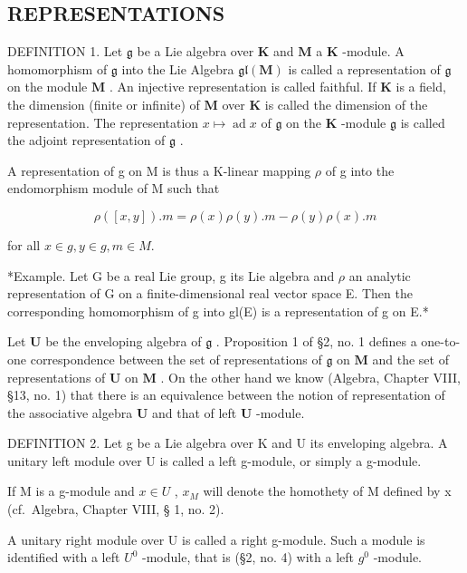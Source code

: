 \subsection{REPRESENTATIONS}

DEFINITION 1. Let \(\mathfrak{g}\) be a Lie algebra over \(\mathbf{K}\) and \(\mathbf{M}\) a \(\mathbf{K}\) -module. A homomorphism of \(\mathfrak{g}\) into the Lie Algebra \(\mathfrak{gl}(\mathbf{M})\) is called a representation of \(\mathfrak{g}\) on the module \(\mathbf{M}\) . An injective representation is called faithful. If \(\mathbf{K}\) is a field, the dimension (finite or infinite) of \(\mathbf{M}\) over \(\mathbf{K}\) is called the dimension of the representation. The representation \(x \mapsto \operatorname{ad} x\) of \(\mathfrak{g}\) on the \(\mathbf{K}\) -module \(\mathfrak{g}\) is called the adjoint representation of \(\mathfrak{g}\) .

A representation of g on M is thus a K-linear mapping \(\rho\) of g into the endomorphism module of M such that

\[
\rho ([ x, y ]). m = \rho (x) \rho (y). m - \rho (y) \rho (x). m
\]

for all \(x \in g, y \in g, m \in M.\)

*Example. Let G be a real Lie group, g its Lie algebra and \(\rho\) an analytic representation of G on a finite-dimensional real vector space E. Then the corresponding homomorphism of g into gl(E) is a representation of g on E.*

Let \(\mathbf{U}\) be the enveloping algebra of \(\mathfrak{g}\) . Proposition 1 of §2, no. 1 defines a one-to-one correspondence between the set of representations of \(\mathfrak{g}\) on \(\mathbf{M}\) and the set of representations of \(\mathbf{U}\) on \(\mathbf{M}\) . On the other hand we know (Algebra, Chapter VIII, §13, no. 1) that there is an equivalence between the notion of representation of the associative algebra \(\mathbf{U}\) and that of left \(\mathbf{U}\) -module.

DEFINITION 2. Let g be a Lie algebra over K and U its enveloping algebra. A unitary left module over U is called a left g-module, or simply a g-module.

If M is a g-module and \(x \in U\) , \(x_{M}\) will denote the homothety of M defined by x (cf.~Algebra, Chapter VIII, § 1, no. 2).

A unitary right module over U is called a right g-module. Such a module is identified with a left \(U^{0}\) -module, that is (§2, no. 4) with a left \(g^{0}\) -module.

